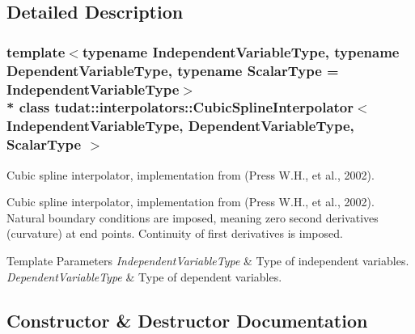 \subsection{Detailed Description}
\subsubsection*{template$<$typename Independent\+Variable\+Type, typename Dependent\+Variable\+Type, typename Scalar\+Type = Independent\+Variable\+Type$>$\\*
class tudat\+::interpolators\+::\+Cubic\+Spline\+Interpolator$<$ Independent\+Variable\+Type, Dependent\+Variable\+Type, Scalar\+Type $>$}

Cubic spline interpolator, implementation from (Press W.\+H., et al., 2002). 

Cubic spline interpolator, implementation from (Press W.\+H., et al., 2002). Natural boundary conditions are imposed, meaning zero second derivatives (curvature) at end points. Continuity of first derivatives is imposed. 
\begin{DoxyTemplParams}{Template Parameters}
{\em Independent\+Variable\+Type} & Type of independent variables. \\
\hline
{\em Dependent\+Variable\+Type} & Type of dependent variables. \\
\hline
\end{DoxyTemplParams}


\subsection{Constructor \& Destructor Documentation}
